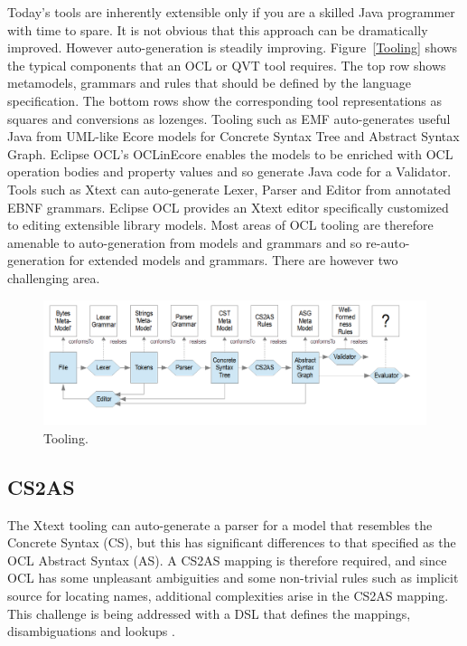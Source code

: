\documentclass{llncs}
\begin{document}
Today's tools are inherently extensible only if you are a skilled Java programmer with time to spare. It is not obvious that this approach can be dramatically improved. However auto-generation is steadily improving. Figure~\ref{Tooling} shows the typical components that an OCL or QVT tool requires. The top row shows metamodels, grammars and rules that should be defined by the language specification. The bottom rows show the corresponding tool representations as squares and conversions as lozenges. Tooling such as EMF auto-generates useful Java from UML-like Ecore models for Concrete Syntax Tree and Abstract Syntax Graph. Eclipse OCL's OCLinEcore enables the models to be enriched with OCL operation bodies and property values and so generate Java code for a Validator. Tools such as Xtext can auto-generate Lexer, Parser and Editor from annotated EBNF grammars. Eclipse OCL provides an Xtext editor specifically customized to editing extensible library models. 
Most areas of OCL tooling are therefore amenable to auto-generation from models and grammars and so re-auto-generation for extended models and grammars.  There are however two challenging area.

\begin{figure}[h]
	\centering
	\includegraphics[width=1.0\textwidth]{Tooling.png}
	\caption{Tooling.}
	\label{fig:Tooling}
\end{figure}

\subsection{CS2AS}

The Xtext tooling can auto-generate a parser for a model that resembles the Concrete Syntax (CS), but this has significant differences to that specified as the OCL Abstract Syntax (AS). A CS2AS mapping is therefore required, and since OCL has some unpleasant ambiguities and some non-trivial rules such as implicit source for locating names, additional complexities arise in the CS2AS mapping. This challenge is being addressed with a DSL that defines the mappings, disambiguations and lookups \cite{cs2as}. 
\end{document}
